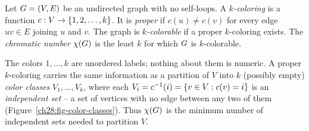 \begin{definition}
\label{ch28:def-coloring}
Let $G=(V,E)$ be an undirected graph with no self-loops. A \emph{$k$-coloring}
is a function $c:V\to\{1,2,\dots,k\}$. It is \emph{proper} if $c(u)\neq c(v)$ for
every edge $uv\in E$ joining $u$ and $v$. The graph is \emph{$k$-colorable} if a proper $k$-coloring
exists. The \emph{chromatic number} $\chi(G)$ is the least $k$ for which $G$
is $k$-colorable.
\end{definition}

The colors $1,\dots,k$ are unordered labels; nothing about them is numeric.
A proper $k$-coloring carries the same information as a partition of $V$ into $k$ (possibly
empty) \emph{color classes} $V_1,\dots,V_k$, where each $V_i=c^{-1}(i)=\{v\in V : c(v)=i\}$ is an
\emph{independent set} -- a set of vertices with no edge between any two of them (Figure~\ref{ch28:fig-color-classes}). Thus $\chi(G)$ is the minimum
number of independent sets needed to partition $V$.

